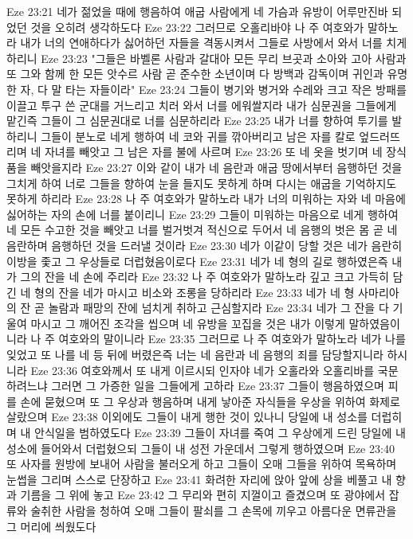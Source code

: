 Eze 23:21  네가 젊었을 때에 행음하여 애굽 사람에게 네 가슴과 유방이 어루만진바 되었던 것을 오히려 생각하도다
Eze 23:22  그러므로 오홀리바야 나 주 여호와가 말하노라 내가 너의 연애하다가 싫어하던 자들을 격동시켜서 그들로 사방에서 와서 너를 치게 하리니
Eze 23:23  "그들은 바벨론 사람과 갈대아 모든 무리 브곳과 소아와 고아 사람과 또 그와 함께 한 모든 앗수르 사람 곧 준수한 소년이며 다 방백과 감독이며 귀인과 유명한 자, 다 말 타는 자들이라"
Eze 23:24  그들이 병기와 병거와 수레와 크고 작은 방패를 이끌고 투구 쓴 군대를 거느리고 치러 와서 너를 에워쌀지라 내가 심문권을 그들에게 맡긴즉 그들이 그 심문권대로 너를 심문하리라
Eze 23:25  내가 너를 향하여 투기를 발하리니 그들이 분노로 네게 행하여 네 코와 귀를 깎아버리고 남은 자를 칼로 엎드러뜨리며 네 자녀를 빼앗고 그 남은 자를 불에 사르며
Eze 23:26  또 네 옷을 벗기며 네 장식품을 빼앗을지라
Eze 23:27  이와 같이 내가 네 음란과 애굽 땅에서부터 음행하던 것을 그치게 하여 너로 그들을 향하여 눈을 들지도 못하게 하며 다시는 애굽을 기억하지도 못하게 하리라
Eze 23:28  나 주 여호와가 말하노라 내가 너의 미워하는 자와 네 마음에 싫어하는 자의 손에 너를 붙이리니
Eze 23:29  그들이 미워하는 마음으로 네게 행하여 네 모든 수고한 것을 빼앗고 너를 벌거벗겨 적신으로 두어서 네 음행의 벗은 몸 곧 네 음란하며 음행하던 것을 드러낼 것이라
Eze 23:30  네가 이같이 당할 것은 네가 음란히 이방을 좇고 그 우상들로 더럽혔음이로다
Eze 23:31  네가 네 형의 길로 행하였은즉 내가 그의 잔을 네 손에 주리라
Eze 23:32  나 주 여호와가 말하노라 깊고 크고 가득히 담긴 네 형의 잔을 네가 마시고 비소와 조롱을 당하리라
Eze 23:33  네가 네 형 사마리아의 잔 곧 놀람과 패망의 잔에 넘치게 취하고 근심할지라
Eze 23:34  네가 그 잔을 다 기울여 마시고 그 깨어진 조각을 씹으며 네 유방을 꼬집을 것은 내가 이렇게 말하였음이니라 나 주 여호와의 말이니라
Eze 23:35  그러므로 나 주 여호와가 말하노라 네가 나를 잊었고 또 나를 네 등 뒤에 버렸은즉 너는 네 음란과 네 음행의 죄를 담당할지니라 하시니라
Eze 23:36  여호와께서 또 내게 이르시되 인자야 네가 오홀라와 오홀리바를 국문하려느냐 그러면 그 가증한 일을 그들에게 고하라
Eze 23:37  그들이 행음하였으며 피를 손에 묻혔으며 또 그 우상과 행음하며 내게 낳아준 자식들을 우상을 위하여 화제로 살랐으며
Eze 23:38  이외에도 그들이 내게 행한 것이 있나니 당일에 내 성소를 더럽히며 내 안식일을 범하였도다
Eze 23:39  그들이 자녀를 죽여 그 우상에게 드린 당일에 내 성소에 들어와서 더럽혔으되 그들이 내 성전 가운데서 그렇게 행하였으며
Eze 23:40  또 사자를 원방에 보내어 사람을 불러오게 하고 그들이 오매 그들을 위하여 목욕하며 눈썹을 그리며 스스로 단장하고
Eze 23:41  화려한 자리에 앉아 앞에 상을 베풀고 내 향과 기름을 그 위에 놓고
Eze 23:42  그 무리와 편히 지껄이고 즐겼으며 또 광야에서 잡류와 술취한 사람을 청하여 오매 그들이 팔쇠를 그 손목에 끼우고 아름다운 면류관을 그 머리에 씌웠도다
